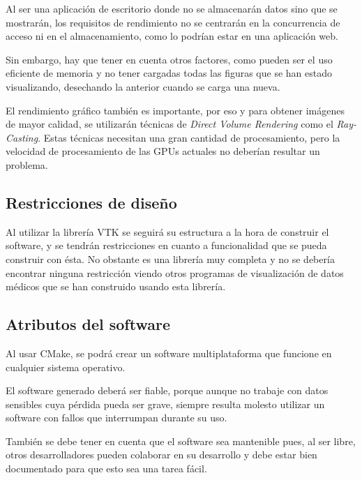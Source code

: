 	Al ser una aplicación de escritorio donde no se almacenarán datos sino que se mostrarán, los requisitos de rendimiento no se centrarán en la concurrencia de acceso ni en el almacenamiento, como lo podrían estar en una aplicación web.
	
	Sin embargo, hay que tener en cuenta otros factores, como pueden ser el uso eficiente de memoria y no tener cargadas todas las figuras que se han estado visualizando, desechando la anterior cuando se carga una nueva.
	
	El rendimiento gráfico también es importante, por eso y para obtener imágenes de mayor calidad, se utilizarán técnicas de \textit{Direct Volume Rendering} como el \textit{Ray-Casting}. Estas técnicas necesitan una gran cantidad de procesamiento, pero la velocidad de procesamiento de las GPUs actuales no deberían resultar un problema.
	
	\subsection{Restricciones de diseño}
	
	Al utilizar la librería VTK se seguirá su estructura a la hora de construir el software, y se tendrán restricciones en cuanto a funcionalidad que se pueda construir con ésta. No obstante es una librería muy completa y no se debería encontrar ninguna restricción viendo otros programas de visualización de datos médicos que se han construido usando esta librería.
	
	\subsection{Atributos del software}
	
	Al usar CMake, se podrá crear un software multiplataforma que funcione en cualquier sistema operativo.
	
	El software generado deberá ser fiable, porque aunque no trabaje con datos sensibles cuya pérdida pueda ser grave, siempre resulta molesto utilizar un software con fallos que interrumpan durante su uso.
	
	También se debe tener en cuenta que el software sea mantenible pues, al ser libre, otros desarrolladores pueden colaborar en su desarrollo y debe estar bien documentado para que esto sea una tarea fácil.